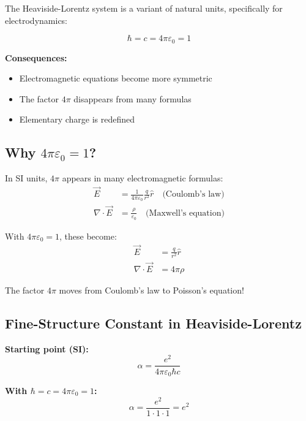 	The Heaviside-Lorentz system is a variant of natural units, specifically for electrodynamics:
	
	\begin{equation}
		\boxed{\hbar = c = 4\pi\varepsilon_0 = 1}
	\end{equation}
	
	\textbf{Consequences:}
	\begin{itemize}
		\item Electromagnetic equations become more symmetric
		\item The factor $4\pi$ disappears from many formulas
		\item Elementary charge is redefined
	\end{itemize}
	
	\subsection[Why 4 pi epsilon 0 = 1]{Why $4\pi\varepsilon_0 = 1$?}
	
	In SI units, $4\pi$ appears in many electromagnetic formulas:
	\begin{align}
		\vec{E} &= \frac{1}{4\pi\varepsilon_0} \frac{q}{r^2} \hat{r} \quad \text{(Coulomb's law)} \\
		\nabla \cdot \vec{E} &= \frac{\rho}{\varepsilon_0} \quad \text{(Maxwell's equation)}
	\end{align}
	
	With $4\pi\varepsilon_0 = 1$, these become:
	\begin{align}
		\vec{E} &= \frac{q}{r^2} \hat{r} \\
		\nabla \cdot \vec{E} &= 4\pi\rho
	\end{align}
	
	The factor $4\pi$ moves from Coulomb's law to Poisson's equation!
	
	\subsection{Fine-Structure Constant in Heaviside-Lorentz}
	
	\textbf{Starting point (SI):}
	\begin{equation}
		\alpha = \frac{e^2}{4\pi\varepsilon_0\hbar c}
	\end{equation}
	
	\textbf{With $\hbar = c = 4\pi\varepsilon_0 = 1$:}
	\begin{equation}
		\alpha = \frac{e^2}{1 \cdot 1 \cdot 1} = e^2
	\end{equation}
	
